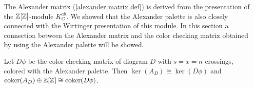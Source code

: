 The Alexander matrix (\cref{alexander matrix def}) is derived from the presentation of the $\operatorname{\mathbb{Z}}[\operatorname{\mathbb{Z}}]$-module $K_G^{ab}$. We showed that the Alexander palette is also closely connected with the Wirtinger presentation of this module. In this section a connection between the Alexander matrix and the color checking matrix obtained by using the Alexander palette will be showed.

\begin{theorem}\label{jadra sa izomorficzne}
  Let $D\phi$ be the color checking matrix of diagram $D$ with $s=x=n$ crossings, colored with the Alexander palette. 
  Then $\ker(A_D)\cong \ker(D\phi)$ and $\operatorname{coker}(A_D)\oplus \operatorname{\mathbb{Z}}[\operatorname{\mathbb{Z}}]\cong \operatorname{coker}(D\phi)$.
\end{theorem}


